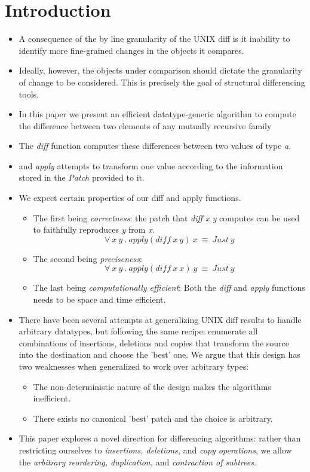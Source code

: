 \section{Introduction}
\begin{itemize}
    \item A consequence of the by line granularity of the UNIX diff is it inability to identify more fine-grained changes in the objects it compares.
    \item Ideally, however, the objects under comparison should dictate the granularity of change to be considered. This is precisely the goal of structural differencing tools.
    \item In this paper we present an efficient datatype-generic algorithm to compute the difference between two elements of any mutually recursive family
    \item The \textit{diff} function computes these differences between two values of type \textit{a}, 
    \item and \textit{apply} attempts to transform one value according to the information stored in the
    \textit{Patch} provided to it.
    \item We expect certain properties of our diff and apply functions.
    \begin{itemize}
        \item The first being \textit{correctness}: the patch that \textit{diff x y} computes can be used to faithfully reproduces \textit{y} from \textit{x}.
        \[
            \forall \: x \: y \: . \: apply (diff \: x \: y) \: x \: \equiv \: Just \: y
        \]
        \item The second being \textit{preciseness}:
        \[
            \forall \: x \: y \: . \: apply (diff \: x \: x) \: y \: \equiv \: Just \: y
        \]
        \item The last being \textit{computationally efficient}: Both the \textit{diff} and \textit{apply} functions needs to be space and time efficient.
    \end{itemize}
    \item There have been several attempts at generalizing UNIX diff results to handle arbitrary datatypes, but following the same recipe: enumerate all combinations of insertions, deletions and copies that transform the source into the destination and choose the 'best' one. We argue that this design has two weaknesses when generalized to work over arbitrary types:
    \begin{itemize}
        \item The non-deterministic nature of the design makes the algorithms inefficient.
        \item There exists no canonical 'best' patch and the choice is arbitrary.
    \end{itemize}
    \item This paper explores a novel direction for differencing algorithms: rather than restricting ourselves to \textit{insertions, deletions,} and \textit{copy operations}, we allow the \textit{arbitrary reordering, duplication,} and \textit{contraction of subtrees}.
\end{itemize}

